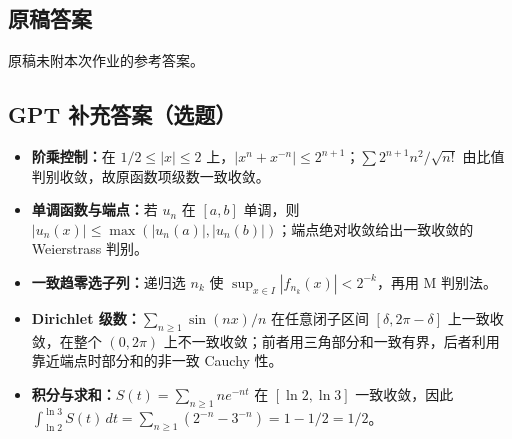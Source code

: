 \documentclass[UTF8,11pt, a4paper, oneside, fontset=none]{ctexbook}
\begin{document}
\subsection*{原稿答案}
\noindent 原稿未附本次作业的参考答案。
\clearpage
\subsection*{GPT 补充答案（选题）}
\begin{itemize}
\item \textbf{阶乘控制：}在 $1/2\le|x|\le2$ 上，$|x^n+x^{-n}|\le2^{n+1}$；$\sum 2^{n+1}n^2/\sqrt{n!}$ 由比值判别收敛，故原函数项级数一致收敛。
\item \textbf{单调函数与端点：}若 $u_n$ 在 $[a,b]$ 单调，则 $|u_n(x)|\le\max(|u_n(a)|,|u_n(b)|)$；端点绝对收敛给出一致收敛的 Weierstrass 判别。
\item \textbf{一致趋零选子列：}递归选 $n_k$ 使 $\sup_{x\in I}|f_{n_k}(x)|<2^{-k}$，再用 M 判别法。
\item \textbf{Dirichlet 级数：}$\sum_{n\ge1}\sin(nx)/n$ 在任意闭子区间 $[\delta,2\pi-\delta]$ 上一致收敛，在整个 $(0,2\pi)$ 上不一致收敛；前者用三角部分和一致有界，后者利用靠近端点时部分和的非一致 Cauchy 性。
\item \textbf{积分与求和：}$S(t)=\sum_{n\ge1}ne^{-nt}$ 在 $[\ln2,\ln3]$ 一致收敛，因此 $\int_{\ln2}^{\ln3}S(t)\,dt=\sum_{n\ge1}(2^{-n}-3^{-n})=1-1/2=1/2$。
\end{itemize}
\end{document}
